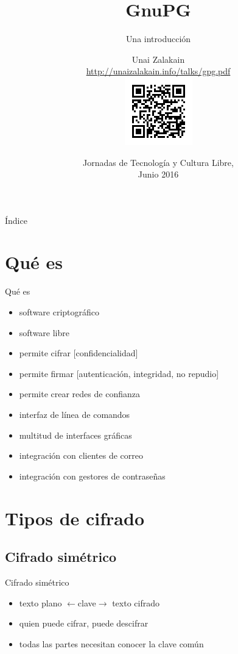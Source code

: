 \documentclass{beamer}
\title{GnuPG}
\subtitle{Una introducción}
\author{Unai Zalakain\\
{\tiny \url{http://unaizalakain.info/talks/gpg.pdf}}\\
\includegraphics[height=.2\textheight]{qrlink}
}
\date{Jornadas de Tecnología y Cultura Libre,\\ Junio 2016}
\begin{document}
\frame{\titlepage}

\begin{frame}{Índice}
\tableofcontents
\end{frame}


\section{Qué es}
\begin{frame}{Qué es}
\begin{itemize}
    \item software criptográfico
    \item software libre
    \item permite cifrar [confidencialidad]
    \item permite firmar [autenticación, integridad, no repudio]
    \item permite crear redes de confianza
    \item interfaz de línea de comandos
    \item multitud de interfaces gráficas
    \item integración con clientes de correo
    \item integración con gestores de contraseñas
\end{itemize}
\end{frame}


\section{Tipos de cifrado}
\subsection{Cifrado simétrico}
\begin{frame}{Cifrado simétrico}
\begin{itemize}
    \item texto plano {\tiny $\leftarrow$clave$\rightarrow$} texto cifrado
    \item quien puede cifrar, puede descifrar
    \item todas las partes necesitan conocer la clave común
\end{itemize}
\end{frame}
\end{document}

